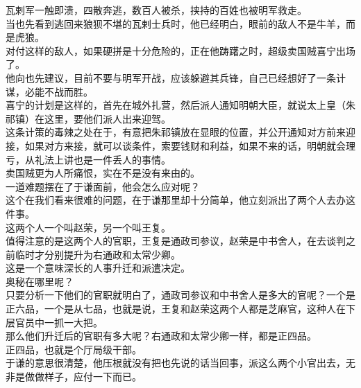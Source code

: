 \begin{multicols}{\theparacolNo}
瓦剌军一触即溃，四散奔逃，数百人被杀，挟持的百姓也被明军救走。\\

当也先看到逃回来狼狈不堪的瓦剌士兵时，他已经明白，眼前的敌人不是牛羊，而是虎狼。\\

对付这样的敌人，如果硬拼是十分危险的，正在他踌躇之时，超级卖国贼喜宁出场了。\\

他向也先建议，目前不要与明军开战，应该躲避其兵锋，自己已经想好了一条计谋，必能不战而胜。\\

喜宁的计划是这样的，首先在城外扎营，然后派人通知明朝大臣，就说太上皇（朱祁镇）在这里，要他们派人出来迎驾。\\

这条计策的毒辣之处在于，有意把朱祁镇放在显眼的位置，并公开通知对方前来迎接，如果对方来接，就可以谈条件，索要钱财和利益，如果不来的话，明朝就会理亏，从礼法上讲也是一件丢人的事情。\\

卖国贼更为人所痛恨，实在不是没有来由的。\\

一道难题摆在了于谦面前，他会怎么应对呢？\\

这个在我们看来很难的问题，在于谦那里却十分简单，他立刻派出了两个人去办这件事。\\

这两个人一个叫赵荣，另一个叫王复。\\

值得注意的是这两个人的官职，王复是通政司参议，赵荣是中书舍人，在去谈判之前临时才分别提升为右通政和太常少卿。\\

这是一个意味深长的人事升迁和派遣决定。\\

奥秘在哪里呢？\\

只要分析一下他们的官职就明白了，通政司参议和中书舍人是多大的官呢？一个是正六品，一个是从七品，也就是说，王复和赵荣这两个人都是芝麻官，这种人在下层官员中一抓一大把。\\

那么他们升迁后的官职有多大呢？右通政和太常少卿一样，都是正四品。\\

正四品，也就是个厅局级干部。\\

于谦的意思很清楚，他压根就没有把也先说的话当回事，派这么两个小官出去，无非是做做样子，应付一下而已。\\


\end{multicols}
